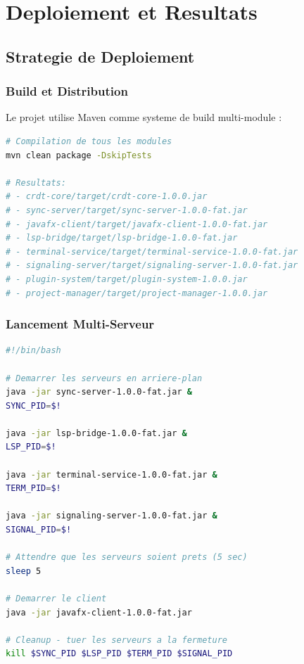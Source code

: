\documentclass[11pt,a4paper,hidelinks]{book}
\begin{document}
\chapter{Deploiement et Resultats}

\section{Strategie de Deploiement}

\subsection{Build et Distribution}

Le projet utilise Maven comme systeme de build multi-module :

\begin{lstlisting}[language=bash, caption={Build Complet}]
# Compilation de tous les modules
mvn clean package -DskipTests

# Resultats:
# - crdt-core/target/crdt-core-1.0.0.jar
# - sync-server/target/sync-server-1.0.0-fat.jar
# - javafx-client/target/javafx-client-1.0.0-fat.jar
# - lsp-bridge/target/lsp-bridge-1.0.0-fat.jar
# - terminal-service/target/terminal-service-1.0.0-fat.jar
# - signaling-server/target/signaling-server-1.0.0-fat.jar
# - plugin-system/target/plugin-system-1.0.0.jar
# - project-manager/target/project-manager-1.0.0.jar
\end{lstlisting}

\subsection{Lancement Multi-Serveur}

\begin{lstlisting}[language=bash, caption={Script de Demarrage}]
#!/bin/bash

# Demarrer les serveurs en arriere-plan
java -jar sync-server-1.0.0-fat.jar &
SYNC_PID=$!

java -jar lsp-bridge-1.0.0-fat.jar &
LSP_PID=$!

java -jar terminal-service-1.0.0-fat.jar &
TERM_PID=$!

java -jar signaling-server-1.0.0-fat.jar &
SIGNAL_PID=$!

# Attendre que les serveurs soient prets (5 sec)
sleep 5

# Demarrer le client
java -jar javafx-client-1.0.0-fat.jar

# Cleanup - tuer les serveurs a la fermeture
kill $SYNC_PID $LSP_PID $TERM_PID $SIGNAL_PID
\end{lstlisting}
\end{document}
